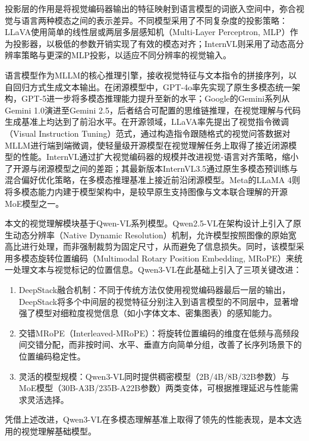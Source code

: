 投影层的作用是将视觉编码器输出的特征映射到语言模型的词嵌入空间中，弥合视觉与语言两种模态之间的表示差异。不同模型采用了不同复杂度的投影策略：LLaVA使用简单的线性层或两层多层感知机（Multi-Layer Perceptron, MLP）作为投影器，以极低的参数开销实现了有效的模态对齐；InternVL则采用了动态高分辨率策略与更深的MLP投影，以适应不同分辨率的视觉输入。

语言模型作为MLLM的核心推理引擎，接收视觉特征与文本指令的拼接序列，以自回归方式生成文本输出。在闭源模型中，GPT-4o率先实现了原生多模态统一架构，GPT-5进一步将多模态推理能力提升至新的水平；Google的Gemini系列从Gemini 1.0演进至Gemini 2.5，后者结合可配置的思维链推理，在视觉理解与代码生成基准上均达到了前沿水平。在开源领域，LLaVA率先提出了视觉指令微调（Visual Instruction Tuning）范式，通过构造指令跟随格式的视觉问答数据对MLLM进行端到端微调，使轻量级开源模型在视觉理解任务上取得了接近闭源模型的性能。InternVL通过扩大视觉编码器的规模并改进视觉-语言对齐策略，缩小了开源与闭源模型之间的差距；其最新版本InternVL3.5通过原生多模态预训练与混合偏好优化策略，在多模态推理基准上接近前沿闭源模型。Meta的LLaMA 4则将多模态能力内建于模型架构中，是较早原生支持图像与文本联合理解的开源MoE模型之一。

本文的视觉理解模块基于Qwen-VL系列模型。Qwen2.5-VL在架构设计上引入了原生动态分辨率（Native Dynamic Resolution）机制，允许模型按照图像的原始宽高比进行处理，而非强制裁剪为固定尺寸，从而避免了信息损失。同时，该模型采用多模态旋转位置编码（Multimodal Rotary Position Embedding, MRoPE）来统一处理文本与视觉标记的位置信息。Qwen3-VL在此基础上引入了三项关键改进：
\begin{enumerate}
  \item DeepStack融合机制：不同于传统方法仅使用视觉编码器最后一层的输出，DeepStack将多个中间层的视觉特征分别注入到语言模型的不同层中，显著增强了模型对细粒度视觉信息（如小字体文本、密集图表）的感知能力。
  \item 交错MRoPE（Interleaved-MRoPE）：将旋转位置编码的维度在低频与高频段间交错分配，而非按时间、水平、垂直方向简单分组，改善了长序列场景下的位置编码稳定性。
  \item 灵活的模型规模：Qwen3-VL同时提供稠密模型（2B/4B/8B/32B参数）与MoE模型（30B-A3B/235B-A22B参数）两类变体，可根据推理延迟与性能需求灵活选择。
\end{enumerate}
凭借上述改进，Qwen3-VL在多模态理解基准上取得了领先的性能表现，是本文选用的视觉理解基础模型。


